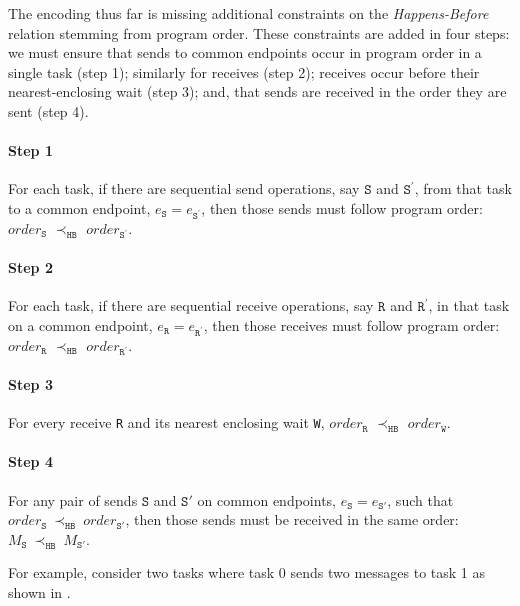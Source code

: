 The encoding thus far is missing
additional constraints on the \emph{Happens-Before} relation stemming from program order. These constraints are added in four steps: we must ensure that sends to common endpoints occur
in program order in a single task (step 1); similarly for receives
(step 2); receives occur before their nearest-enclosing wait (step 3);
and, that sends are received in the order they are sent (step 4).

\paragraph*{Step 1} For each task, if there are sequential send
operations, say $\mathtt{S}$ and $\mathtt{S^\prime}$, from that task
to a common endpoint, $e_\mathtt{S} = e_\mathtt{S^\prime}$, then those
sends must follow program order: $\mathit{order}_\mathtt{S}$
$\prec_\mathtt{HB}$ $\mathit{order}_\mathtt{S^\prime}$.

\paragraph*{Step 2} For each task, if there are sequential receive
operations, say $\mathtt{R}$ and $\mathtt{R^\prime}$, in that task
on a common endpoint, $e_\mathtt{R} = e_\mathtt{R^\prime}$, then those
receives must follow program order: $\mathit{order}_\mathtt{R}$
$\prec_\mathtt{HB}$ $\mathit{order}_\mathtt{R^\prime}$.

\paragraph*{Step 3} For every receive \texttt{R} and its nearest
enclosing wait \texttt{W}, $\mathit{order}_\mathtt{R}$
$\prec_\mathtt{HB}$ $\mathit{order}_\mathtt{W}$.

\paragraph*{Step 4} For any pair of sends $\mathtt{S}$ and
$\mathtt{S'}$ on common endpoints, $e_{\mathtt{S}}=e_{\mathtt{S'}}$,
such that
$\mathit{order}_\mathtt{S}\ \mathrm{\prec_\mathtt{HB}}\ \mathit{order}_\mathtt{S'}$,
then those sends must be received in the same order:
$M_{\mathtt{S}}\ \mathrm{\prec_{\mathtt{HB}}}\ M_{\mathtt{S'}}$.

For example, consider two tasks where task 0 sends two messages to
task 1 as shown in .

